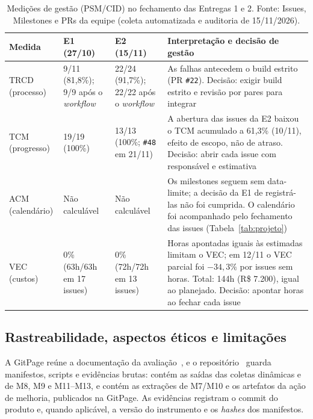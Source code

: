 \documentclass[conference]{model/IEEEtran}%
\begin{document}
\begin{table}[!t]
\centering
\caption{Medições de gestão (PSM/CID) no fechamento das Entregas 1 e 2. Fonte: Issues, Milestones e PRs da equipe (coleta automatizada e auditoria de 15/11/2026).}
\label{tab:psmcid}
\scriptsize
\setlength{\tabcolsep}{2.2pt}
\begin{tabular}{@{}L{1.05cm}L{1.55cm}L{1.75cm}L{3.75cm}@{}}
\toprule
\textbf{Medida} & \textbf{E1 (27/10)} & \textbf{E2 (15/11)} & \textbf{Interpretação e decisão de gestão} \\
\midrule
TRCD (processo) &
9/11 (81,8\%); 9/9 após o \textit{workflow} &
22/24 (91,7\%); 22/22 após o \textit{workflow} &
As falhas antecedem o build estrito (PR \texttt{\#22}). Decisão: exigir build estrito e revisão por pares para integrar \\
\addlinespace[2pt]
TCM (progresso) &
19/19 (100\%) &
13/13 (100\%; \texttt{\#48} em 21/11) &
A abertura das issues da E2 baixou o TCM acumulado a 61,3\% (10/11), efeito de escopo, não de atraso. Decisão: abrir cada issue com responsável e estimativa \\
\addlinespace[2pt]
ACM (calendário) &
Não calculável &
Não calculável &
Os milestones seguem sem data-limite; a decisão da E1 de registrá-las não foi cumprida. O calendário foi acompanhado pelo fechamento das issues (Tabela~\ref{tab:projeto}) \\
\addlinespace[2pt]
VEC (custos) &
0\% (63h/63h em 17 issues) &
0\% (72h/72h em 13 issues) &
Horas apontadas iguais às estimadas limitam o VEC; em 12/11 o VEC parcial foi $-34{,}3\%$ por issues sem horas. Total: 144h (R\$ 7.200), igual ao planejado. Decisão: apontar horas ao fechar cada issue \\
\bottomrule
\end{tabular}
\end{table}

\subsection{Rastreabilidade, aspectos éticos e limitações}\label{sec:limitacoes}
A GitPage reúne a documentação da avaliação~\cite{gracehopper_gqm,gracehopper_pc1}, e o repositório~\cite{repo_gracehopper} guarda manifestos, scripts e evidências brutas:  contém as saídas das coletas dinâmicas e de M8, M9 e M11--M13, e  contém as extrações de M7/M10 e os artefatos da ação de melhoria, publicados na GitPage. As evidências registram o commit do produto e, quando aplicável, a versão do instrumento e os \textit{hashes} dos manifestos.
\end{document}
